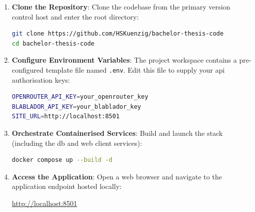 \begin{enumerate}
    \item \textbf{Clone the Repository}:
    Clone the codebase from the primary version control host and enter the root directory:
\begin{lstlisting}[language=bash, caption={Cloning source directory}, xleftmargin=\leftmargin]
git clone https://github.com/HSKuenzig/bachelor-thesis-code
cd bachelor-thesis-code
    \end{lstlisting}

    \item \textbf{Configure Environment Variables}:
    The project workspace contains a pre-configured template file named \texttt{.env}.
    Edit this file to supply your \ac{api} authorisation keys:
\begin{lstlisting}[language=bash, caption={Environment file keys}, xleftmargin=\leftmargin]
OPENROUTER_API_KEY=your_openrouter_key
BLABLADOR_API_KEY=your_blablador_key
SITE_URL=http://localhost:8501
\end{lstlisting}

    \item \textbf{Orchestrate Containerised Services}:
    Build and launch the stack (including the \ac{db} and web client services):
\begin{lstlisting}[language=bash, caption={Starting docker service stack}, xleftmargin=\leftmargin]
docker compose up --build -d
\end{lstlisting}
    \item \textbf{Access the Application}:
    Open a web browser and navigate to the application endpoint hosted locally:
    \begin{flushleft}
    \url{http://localhost:8501}
    \end{flushleft}
\end{enumerate}
